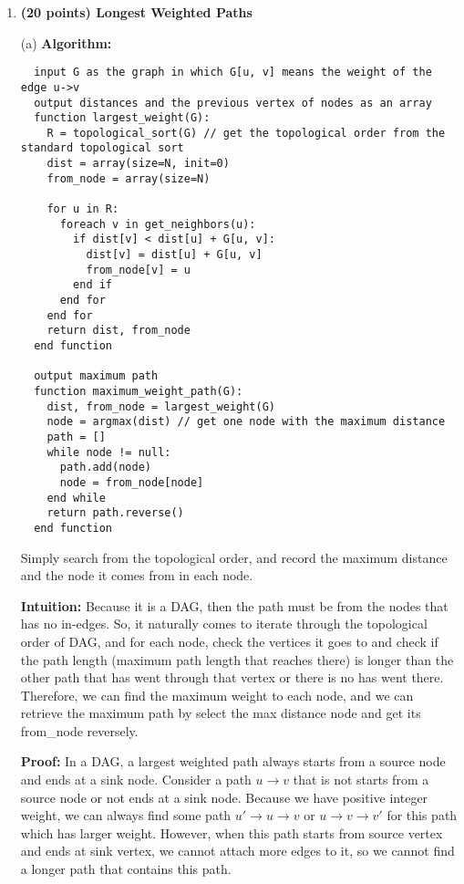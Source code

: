 \documentclass{article}
\begin{document}
\begin{enumerate}[topsep=0pt]

\item \textbf{(20 points) Longest Weighted Paths}

(a)
\textbf{Algorithm:}
\begin{verbatim}
  input G as the graph in which G[u, v] means the weight of the edge u->v
  output distances and the previous vertex of nodes as an array
  function largest_weight(G):
    R = topological_sort(G) // get the topological order from the standard topological sort
    dist = array(size=N, init=0)
    from_node = array(size=N)

    for u in R:
      foreach v in get_neighbors(u):
        if dist[v] < dist[u] + G[u, v]:
          dist[v] = dist[u] + G[u, v]
          from_node[v] = u
        end if
      end for
    end for
    return dist, from_node
  end function

  output maximum path
  function maximum_weight_path(G):
    dist, from_node = largest_weight(G)
    node = argmax(dist) // get one node with the maximum distance
    path = []
    while node != null:
      path.add(node)
      node = from_node[node]
    end while
    return path.reverse()
  end function
\end{verbatim}

Simply search from the topological order, and record the maximum distance and the node it comes from in each node.

\textbf{Intuition:}
Because it is a DAG, then the path must be from the nodes that has no in-edges. 
So, it naturally comes to iterate through the topological order of DAG, 
and for each node, check the vertices it goes to and check if the path length (maximum path length that reaches there) is longer than the other path that has
went through that vertex or there is no has went there.
Therefore, we can find the maximum weight to each node, and we can retrieve the maximum path by select the max distance node and get its from\_node reversely.


\textbf{Proof:}
In a DAG, a largest weighted path always starts from a source node and ends at a sink node.
Consider a path $u\rightarrow v$ that is not starts from a source node or not ends at a sink node.
Because we have positive integer weight, we can always find some path $u'\rightarrow u\rightarrow v$
or $u\rightarrow v\rightarrow v'$ for this path which has larger weight.
However, when this path starts from source vertex and ends at sink vertex, 
we cannot attach more edges to it, so we cannot find a longer path that contains this path.


\end{enumerate}
\end{document}
